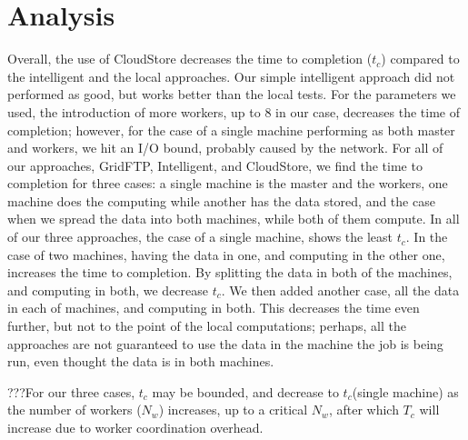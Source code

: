 \section{Analysis}

Overall, the use of CloudStore decreases the time to completion
($t_c$) compared to the intelligent and the local approaches. Our
simple intelligent approach did not performed as good, but works
better than the local tests. For the parameters we used, the
introduction of more workers, up to 8 in our case, decreases the time
of completion; however, for the case of a single machine performing as
both master and workers, we hit an I/O bound, probably caused by the
network. For all of our approaches, GridFTP, Intelligent, and
CloudStore, we find the time to completion for three cases: a single
machine is the master and the workers, one machine does the computing
while another has the data stored, and the case when we spread the
data into both machines, while both of them compute.  In all of our
three approaches, the case of a single machine, shows the least
$t_c$. In the case of two machines, having the data in one, and
computing in the other one, increases the time to completion. By
splitting the data in both of the machines, and computing in both, we
decrease $t_c$. We then added another case, all the data in each of
machines, and computing in both. This decreases the time even further,
but not to the point of the local computations; perhaps, all the
approaches are not guaranteed to use the data in the machine the job
is being run, even thought the data is in both machines.

???For our three cases,  $t_c$ may be bounded, and decrease to $t_c$(single machine) as  the number of workers ($N_w$) increases, up to a critical $N_w$, after which $T_c$ will increase due to worker coordination overhead.



